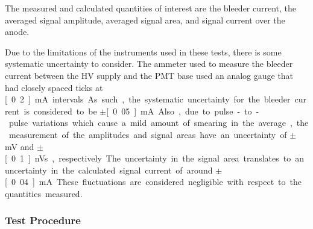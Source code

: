 The measured and calculated quantities of interest are the bleeder current, the averaged signal amplitude, averaged signal area, and signal current over the anode.

Due to the limitations of the instruments used in these tests, there is some systematic uncertainty to consider. The ammeter used to measure the bleeder current between the HV supply and the PMT base used an analog gauge that had closely spaced ticks at \unit[0.2]{mA} intervals. As such, the systematic uncertainty for the bleeder current is considered to be $\pm$\unit[0.05]{mA}. Also, due to pulse-to-pulse variations which cause a mild amount of smearing in the average, the measurement of the amplitudes and signal areas have an uncertainty of $\pm$\unit[5]{mV} and $\pm$\unit[0.1]{nVs}, respectively. The uncertainty in the signal area translates to an uncertainty in the calculated signal current of around $\pm$\unit[0.04]{mA}. These fluctuations are considered negligible with respect to the quantities measured.

\subsubsection{Test Procedure}

